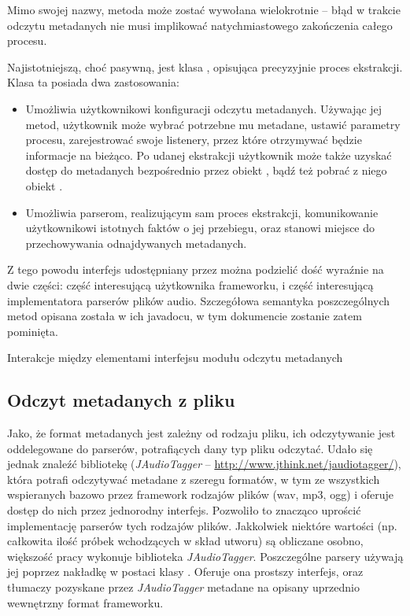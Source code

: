 \begin{Note}
Mimo swojej nazwy, metoda  może zostać wywołana wielokrotnie -- błąd w trakcie odczytu
metadanych nie musi implikować natychmiastowego zakończenia całego procesu.
\end{Note}


Najistotniejszą, choć pasywną, jest klasa , opisująca precyzyjnie proces
ekstrakcji. Klasa ta posiada dwa zastosowania:

\begin{itemize}

  \item Umożliwia użytkownikowi konfiguracji odczytu metadanych. Używając jej metod, użytkownik może
    wybrać potrzebne mu metadane, ustawić parametry procesu, zarejestrować swoje listenery, przez
    które otrzymywać będzie informacje na bieżąco. Po udanej ekstrakcji użytkownik może także
    uzyskać dostęp do metadanych bezpośrednio przez obiekt , bądź też pobrać
    z niego obiekt .

  \item Umożliwia parserom, realizującym sam proces ekstrakcji, komunikowanie użytkownikowi
    istotnych faktów o jej przebiegu, oraz stanowi miejsce do przechowywania odnajdywanych
    metadanych.

\end{itemize}

Z tego powodu interfejs udostępniany przez  można podzielić dość wyraźnie na
dwie części: część interesującą użytkownika frameworku, i część interesującą implementatora parserów
plików audio. Szczegółowa semantyka poszczególnych metod opisana została w ich javadocu, w tym
dokumencie zostanie zatem pominięta.

{Interakcje między elementami interfejsu modułu odczytu metadanych}


\subsection{Odczyt metadanych z pliku}
\label{sec:metadane_odczyt}

Jako, że format metadanych jest zależny od rodzaju pliku, ich odczytywanie jest oddelegowane do
parserów, potrafiących dany typ pliku odczytać. Udało się jednak znaleźć bibliotekę
(\emph{JAudioTagger} -- \url{http://www.jthink.net/jaudiotagger/}), która potrafi odczytywać
metadane z szeregu formatów, w tym ze wszystkich wspieranych bazowo przez framework rodzajów plików
(wav, mp3, ogg) i oferuje dostęp do nich przez jednorodny interfejs. Pozwoliło to znacząco uprościć
implementację parserów tych rodzajów plików.  Jakkolwiek niektóre wartości (np. całkowita ilość
próbek wchodzących w skład utworu) są obliczane osobno, większość pracy wykonuje biblioteka
\emph{JAudioTagger}. Poszczególne parsery używają jej poprzez nakładkę w postaci klasy
. Oferuje ona prostszy interfejs, oraz tłumaczy pozyskane przez
\emph{JAudioTagger} metadane na opisany uprzednio wewnętrzny format frameworku.


